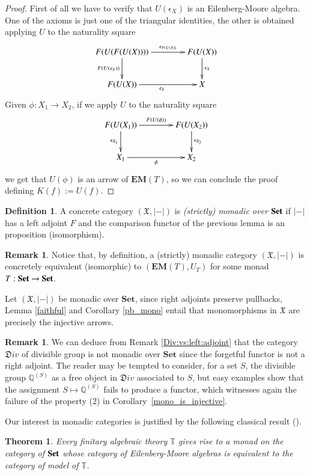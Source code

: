 \documentclass[12pt]{article}
\newtheorem{theorem}[lemma]{Theorem}
\theoremstyle{definition}
\newtheorem{definition}[lemma]{Definition}
\newtheorem{remark}[lemma]{Remark}
\def\Q{\mathbb Q}
\def\X{\mathfrak X}
\newcommand{\Set}{\textbf{\textup{Set}}}
\newcommand{\eim}[1]{\mathbf{EM}{(#1)}}
\numberwithin{equation}{section}
\newcommand{\catname}[1]{\mathbf{#1}}
\begin{document}
\begin{proof}
	First of all we have to verify that $U(\epsilon_X)$ is an Eilenberg-Moore algebra. One of the axioms is just one of the triangular identities, the other is obtained applying $U$ to the naturality square
	\[
	\xymatrix@C=40pt{F(U(F(U(X))))\ar[r]^-{\epsilon_{F(U(X))}}\ar[d]_{F(U(\epsilon_X))} & F(U(X))\ar[d]^{\epsilon_X}\\ F(U(X)) \ar[r]_{\epsilon_X} & X }
	\]
	Given $\phi:X_1\rightarrow X_2$, if we apply $U$ to the naturality square
	\[	\xymatrix@C=40pt{F(U(X_1))\ar[r]^-{F(U(\phi))}\ar[d]_{\epsilon_{X_1}} & F(U(X_2))\ar[d]^{\epsilon_{X_2}}\\ X_1\ar[r]_{\phi} & X_2 } \] 
	 we get that $U(\phi)$ is an arrow of $\eim{T}$, so we can conclude the proof defining $K(f):=U(f)$.
\end{proof}

\begin{definition}A concrete category $(\X, |-|)$ is \emph{(strictly) monadic over $\Set$} if $|-|$ has a left adjoint $F$ and the comparison functor of the previous lemma is an proposition (isomorphism).
\end{definition}
\begin{remark}Notice that, by definition, a (strictly) monadic category $(\X, |-|)$ is concretely equivalent (isomorphic) to $(\eim{T}, U_T)$ for some monad $T:\Set\rightarrow \Set$.
\end{remark}

 Let  $(\X, |-|)$ be monadic over $\catname{Set}$, since right adjoints preserve pullbacks, Lemma \ref{faithful} and Corollary \ref{pb_mono} entail that monomorphisms in $\X$ are precisely the injective arrows.
\begin{remark} We can deduce from Remark \ref{Div:vs:left:adjoint} that the category $\mathfrak D iv$ of divisible group is not monadic over $\catname{Set}$ since the forgetful functor is not a right adjoint.
	The reader may be tempted to consider, for a set $S$, the divisible group $\Q^{(S)}$ as a free object in $\mathfrak D iv$ associated to $S$, but easy examples show that the assignment $S \mapsto \Q^{(S)}$ fails to produce a functor, which witnesses again the failure of the property (2) in Corollary~\ref{mono_is_injective}.
\end{remark}


Our interest in monadic categories is justified by the following classical result (\cite{bor2,stone,algth,ManAlg,lawvere}).
\begin{theorem}Every finitary algebraic theory $\mathbb{T}$ gives rise to a monad on the category of $\Set$ whose category of Eilenberg-Moore algebras is equivalent to the category of model of $\mathbb{T}$.
\end{theorem}
\end{document}
